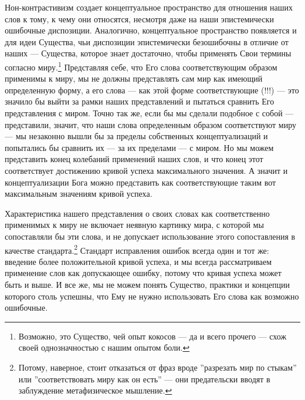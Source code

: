 \documentclass[11pt]{book}
\begin{document}
Нон-контрастивизм создает концептуальное пространство для отношения наших слов к тому, к чему они относятся, несмотря даже на наши эпистемически ошибочные диспозиции. Аналогично, концептуальное пространство появляется и для идеи Существа, чьи диспозиции эпистемически безошибочны в отличие от наших --- Существа, которое знает достаточно, чтобы применять Свои термины согласно миру.\footnote{Возможно, это Существо, чей опыт кокосов --- да и всего прочего --- схож своей однозначностью с нашим опытом боли.} Представляя себе, что Его слова соответствующим образом применимы к миру, мы не должны представлять сам мир как имеющий определенную форму, а его слова --- как этой форме соответствующие (!!!) --- это значило бы выйти за рамки наших представлений и пытаться сравнить Его представления с миром. Точно так же, если бы мы сделали подобное с собой --- представили, значит, что наши слова определенным образом соответствуют миру --- мы незаконно вышли бы за пределы собственных концептуализаций и попытались бы сравнить их --- за их пределами --- с миром. Но мы можем представить конец колебаний применений наших слов, и что конец этот соответствует достижению кривой успеха максимального значения. А значит и концептуализации Бога можно представить как соответствующие таким вот максимальным значениям кривой успеха.

Характеристика нашего представления о своих словах как соответственно применимых к миру не включает неявную картинку мира, с которой мы сопоставляли бы эти слова, и не допускает использование этого сопоставления в качестве стандарта.\footnote{Потому, наверное, стоит отказаться от фраз вроде ''разрезать мир по стыкам'' или ''соответствовать миру как он есть'' --- они предательски вводят в заблуждение метафизическое мышление.} Стандарт исправления ошибок всегда один и тот же: введение более положительной кривой успеха, и мы всегда рассматриваем применение слов как допускающее ошибку, потому что кривая успеха может быть и выше. И все же, мы не можем понять Существо, практики и концепции которого столь успешны, что Ему не нужно использовать Его слова как возможно ошибочные.
\end{document}
